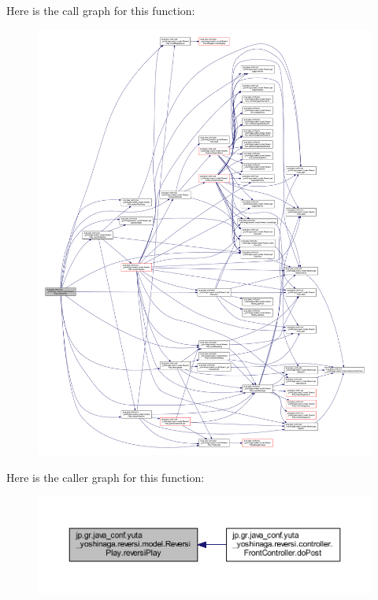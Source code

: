 Here is the call graph for this function\+:
\nopagebreak
\begin{figure}[H]
\begin{center}
\leavevmode
\includegraphics[width=350pt]{classjp_1_1gr_1_1java__conf_1_1yuta__yoshinaga_1_1reversi_1_1model_1_1_reversi_play_ac2fb56755f7f7d7ab0675035e8581ab1_cgraph}
\end{center}
\end{figure}
Here is the caller graph for this function\+:
\nopagebreak
\begin{figure}[H]
\begin{center}
\leavevmode
\includegraphics[width=350pt]{classjp_1_1gr_1_1java__conf_1_1yuta__yoshinaga_1_1reversi_1_1model_1_1_reversi_play_ac2fb56755f7f7d7ab0675035e8581ab1_icgraph}
\end{center}
\end{figure}
